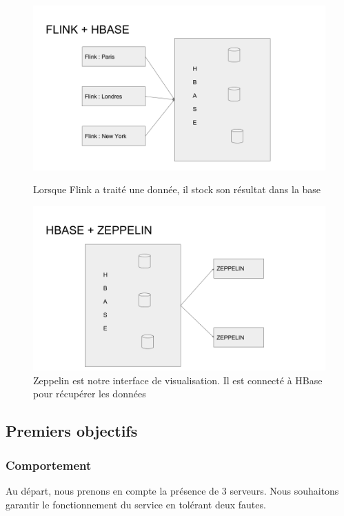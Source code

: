 \documentclass[a4paper,oneside,10pt]{article}
\begin{document}
\begin{figure}[h]
\centering
\includegraphics[width=16cm]{content/FlinkHbase.png}
\caption{Lorsque Flink a traité une donnée, il stock son résultat dans la base}
\label{fig1}
\centering
\includegraphics[width=16cm]{content/HbaseZeppelin.png}
\caption{Zeppelin est notre interface de visualisation. Il est connecté à HBase pour récupérer les données}
\label{fig1}
\end{figure}

\pagebreak

\subsection{Premiers objectifs}

\subsubsection{Comportement}

Au départ, nous prenons en compte la présence de 3 serveurs. 
Nous souhaitons garantir le fonctionnement du service en tolérant deux fautes. 
\end{document}
